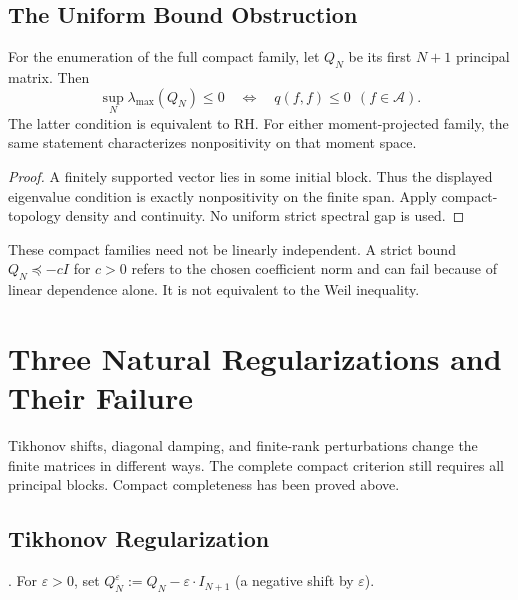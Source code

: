 \subsection{The Uniform Bound Obstruction}
\label{v4-arith:w7-h:finite-N:uniform}

\begin{theorem}
\label{v4-arith:w7-h:thm:uniform}
For the enumeration of the full compact family, let $Q_N$ be its
first $N+1$ principal matrix. Then
\[
 \sup_N\lambda_{\max}(Q_N)\le0
 \quad\Longleftrightarrow\quad
 q(f,f)\le0\ \ (f\in\mathscr A).
\]
The latter condition is equivalent to RH.
For either moment-projected family, the same statement characterizes
nonpositivity on that moment space.
\end{theorem}
\begin{proof}
A finitely supported vector lies in some initial block.
Thus the displayed eigenvalue condition is exactly nonpositivity on
the finite span. Apply compact-topology density and continuity.
No uniform strict spectral gap is used.
\end{proof}
\begin{remark}
\label{v4-arith:w7-h:rem:uniform-ceiling}
These compact families need not be linearly independent.
A strict bound $Q_N\preceq-cI$ for $c>0$ refers to the chosen
coefficient norm and can fail because of linear dependence alone.
It is not equivalent to the Weil inequality.
\end{remark}

\section{Three Natural Regularizations and Their Failure}
\label{v4-arith:w7-h:regularizations}

Tikhonov shifts, diagonal damping, and finite-rank perturbations change
the finite matrices in different ways. The complete compact criterion
still requires all principal blocks. Compact completeness has been
proved above.

\subsection{Tikhonov Regularization}
\label{v4-arith:w7-h:regularizations:tikhonov}

\begin{definition}
\label{v4-arith:w7-h:def:tikhonov}
\ClaimStatusDefinitional. For \(\varepsilon>0\), set
\(Q_{N}^{\varepsilon}:=Q_{N}-\varepsilon\cdot I_{N+1}\)
(a negative shift by \(\varepsilon\)).
\end{definition}

